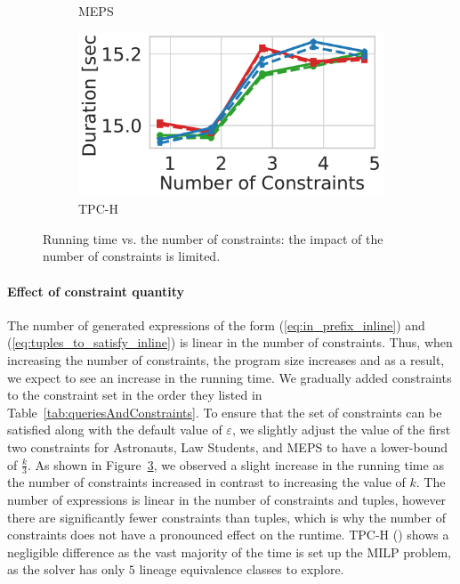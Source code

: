 \begin{figure}[t]
\begin{subfigure}{.35\textwidth}
      \caption{MEPS}
      \label{fig:r15}
    \end{subfigure}
    \begin{subfigure}{.35\textwidth}
      \centering
      \includegraphics[width=.75\linewidth]{figures/tpch_num.pdf}
      \caption{TPC-H}
      \label{fig:r16}
    \end{subfigure}
    
    \caption{Running time vs. the number of constraints: the impact of the number of constraints is limited.}
    \label{fig:time_vs_num_of_constraints}
\end{figure}
\paragraph*{\textbf{Effect of constraint quantity}}
The number of generated expressions of the form (\ref{eq:in_prefix_inline}) and (\ref{eq:tuples_to_satisfy_inline}) is linear in the number of constraints. Thus, when increasing the number of constraints, the program size increases and as a result, we expect to see an increase in the running time.
We gradually added constraints to the constraint set in the order they listed in Table~\ref{tab:queriesAndConstraints}. To ensure that the set of constraints can be satisfied along with the default value of $\varepsilon$, we slightly adjust the value of the first two constraints for Astronauts, Law Students, and MEPS to have a lower-bound of $\frac{k}{3}$. As shown in Figure~\ref{fig:time_vs_num_of_constraints}, we observed a slight increase in the running time as the number of constraints increased in contrast to increasing the value of $k$. The number of expressions is linear in the number of constraints and tuples, however there are significantly fewer constraints than tuples, which is why the number of constraints does not have a pronounced effect on the runtime.
TPC-H () shows a negligible difference as the vast majority of the time is set up the MILP problem, as the solver has only $5$ lineage equivalence classes to explore.

